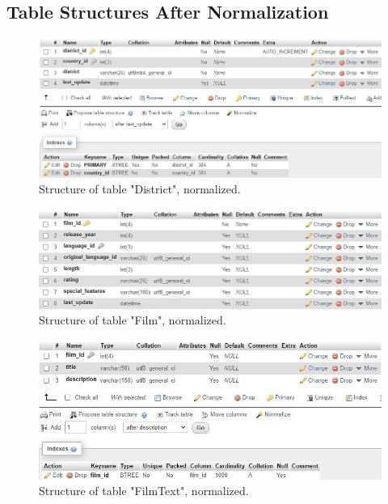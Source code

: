 \documentclass{article}
\begin{document}
	\subsection{Table Structures After Normalization}
		\begin{figure}[H]
			\includegraphics[width=\textwidth]{table_district_nstruct}
			\caption{Structure of table "District", normalized.}
		\end{figure}
		\begin{figure}[H]
			\includegraphics[width=\textwidth]{table_film_nstruct}
			\caption{Structure of table "Film", normalized.}
		\end{figure}
		\begin{figure}[H]
			\includegraphics[width=\textwidth]{table_filmtext_nstruct}
			\caption{Structure of table "Film\textunderscore Text", normalized.}
		\end{figure}
\end{document}
